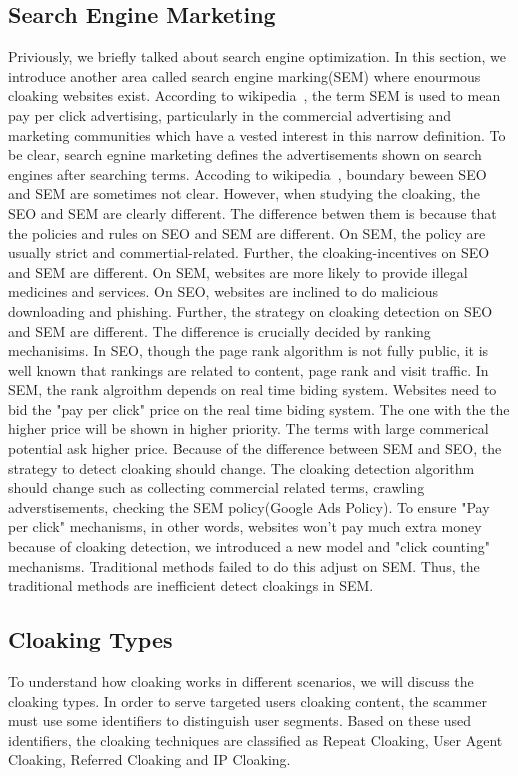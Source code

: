 \subsection{Search Engine Marketing}
Priviously, we briefly talked about search engine optimization. In this section, we introduce another area called search engine marking(SEM)
where enourmous cloaking websites exist. According to wikipedia~\cite{sem-wiki}, the term SEM is used to mean pay per click advertising,
particularly in the commercial advertising and marketing communities which have a vested interest in this narrow definition. To be clear,
search egnine marketing defines the advertisements shown on search engines after searching terms. Accoding to wikipedia~\cite{sem-wiki},
boundary beween SEO and SEM are sometimes not clear. However, when studying the cloaking, the SEO and SEM are clearly different. The difference
betwen them is because that the policies and rules on SEO and SEM are different. On SEM, the policy are usually strict and commertial-related. 
Further, the cloaking-incentives on SEO and SEM are different. On SEM, websites are more likely to provide illegal medicines and services. On SEO,
websites are inclined to do malicious downloading and phishing. 
Further, the strategy on cloaking detection on SEO and SEM are different. The difference is crucially decided by ranking mechanisims.
In SEO, though the page rank algorithm is not fully public, it is well known that rankings are related to content, page rank and visit traffic.
In SEM, the rank algroithm depends on real time biding system. Websites need to bid the "pay per click" price on the real time biding system. 
The one with the the higher price will be shown in higher priority. The terms with large commerical potential ask higher price. Because of the 
difference between SEM and SEO, the strategy to detect cloaking should change. The cloaking detection algorithm should change such as collecting commercial related terms, 
crawling adverstisements, checking the SEM policy(Google Ads Policy). To ensure "Pay per click" mechanisms, in other words,
websites won't pay much extra money because of cloaking detection, we introduced a new model and "click counting" mechanisms.
Traditional methods failed to do this adjust on SEM. Thus, the traditional methods are inefficient detect cloakings in SEM.
\subsection{Cloaking Types}
To understand how cloaking works in different scenarios, we will discuss the cloaking types.
In order to serve targeted users cloaking content, the scammer must use some identifiers to distinguish 
user segments. Based on these used identifiers, the cloaking techniques are classified as Repeat Cloaking, 
User Agent Cloaking, Referred Cloaking and IP Cloaking. 

